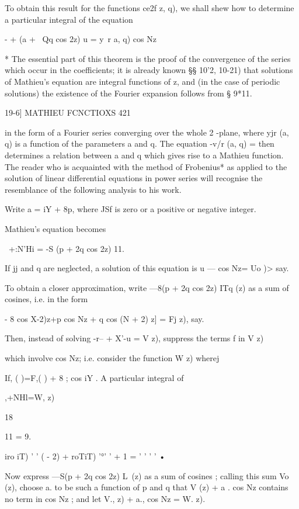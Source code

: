 To obtain this result for the functions ce2f z, q), we shall shew how to 
determine a particular integral of the equation 

-  + (a + \ Qq cos 2z) u = y\ r  a, q) cos Nz 

* The essential part of this theorem is the proof of the convergence of the series which occur 
in the coefficients; it is already known  §§ 10'2, 10-21) that solutions of Mathieu's equation are 
integral functions of z, and (in the case of periodic solutions) the existence of the Fourier 
expansion follows from § 9*11. 



19-6] MATHIEU FCNCTIOXS 421 

in the form of a Fourier series converging over the whole 2 -plane, where 
yjr (a, q) is a function of the parameters a and q. The equation -v/r (a, q) = 
then determines a relation between a and q which gives rise to a Mathieu 
function. The reader who is acquainted with the method of Frobenius* as 
applied to the solution of linear differential equations in power series will 
recognise the resemblance of the following analysis to his work. 

Write a = iY  + 8p, where JSf is zero or a positive or negative integer. 

Mathieu's equation becomes 

 \ +:N'Hi = -S (p + 2q cos 2z) 11. 

If jj and q are neglected, a solution of this equation is u — cos Nz= Uo  )> 
say. 

To obtain a closer approximation, write —8(p + 2q cos 2z) ITq (z) as a sum 
of cosines, i.e. in the form 

- 8    cos  X-2)z+p cos Nz + q cos (N + 2) z] = Fj  z), say. 

Then, instead of solving -r-- + X'-u = V   z), suppress the terms f in V   z) 

which involve cos Nz; i.e. consider the function W   z) wherej 

If, ( )=F,( ) + 8 ; cos iY . 
A particular integral of 



 ,+NHl=W, z) 



18 

11 = 9. 



iro iT) ' ' (  - 2)   + roTiT) '°'  ' +   1 =  '  ' ' ' • 



Now express —S(p + 2q cos 2z) L\ (z) as a sum of cosines ; calling this 
sum Vo (z), choose a. to be such a function of p and q that V  (z) + a . cos Nz 
contains no term in cos Nz ; and let V.,  z) + a., cos Nz = W.   z). 


